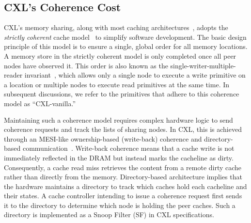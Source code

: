 \subsection{CXL's Coherence Cost}  

CXL's memory sharing, along with most caching architectures~\cite{rvweak_pact17, armcm_cmb12, powercm_pldi11, rvweak_isca18, gam, txcache_osdi10}, adopts the \textit{strictly coherent} cache model~\cite{munin_ppopp90, rtm_isca14} to simplify software development. The basic design principle of this model is to ensure a single, global order for all memory locations. A memory store in the strictly coherent model is only completed once all peer nodes have observed it. This order is also known as the single-writer-multiple-reader invariant~\cite{book_cc}, which allows only a single node to execute a write primitive on a location or multiple nodes to execute read primitives at the same time.
In subsequent discussions, we refer to the primitives that adhere to this coherence model as ``CXL-vanilla.''


Maintaining such a coherence model requires complex hardware logic to send coherence requests and track the lists of sharing nodes. In CXL, this is achieved through an MESI-like ownership-based (write-back) coherence and directory-based communication~\cite{spandex_asplos18, book_cc, denovo_pact11, quantitative_approach}. 
Write-back coherence means that a cache write is not immediately reflected in the DRAM but instead marks the cacheline as dirty. Consequently, a cache read miss retrieves the content from a remote dirty cache rather than directly from the memory.
Directory-based architecture implies that the hardware maintains a directory to track which caches hold each cacheline and their states. A cache controller intending to issue a coherence request first sends it to the directory to determine which node is holding the peer caches. Such a directory is implemented as a Snoop Filter (SF) in CXL specifications.






